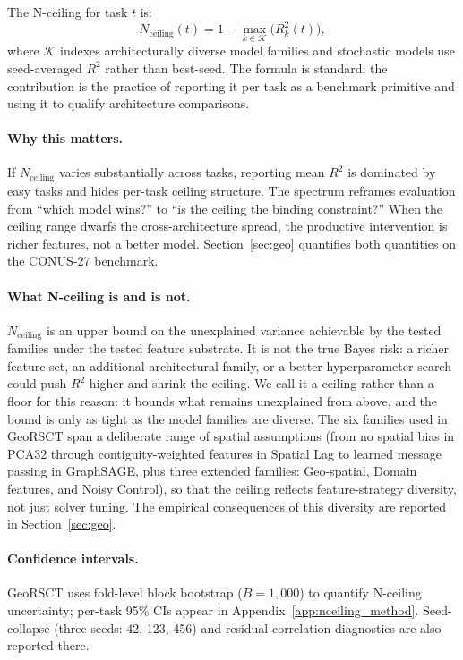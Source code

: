 \documentclass{article}
\begin{document}
The N-ceiling for task $t$ is:
\begin{equation}
N_{\text{ceiling}}(t) = 1 - \max_{k \in \mathcal{K}}\bigl(R^2_k(t)\bigr),
\label{eq:nceiling}
\end{equation}
where $\mathcal{K}$ indexes architecturally diverse model families and stochastic models use seed-averaged $R^2$ rather than best-seed. The formula is standard; the contribution is the practice of reporting it per task as a benchmark primitive and using it to qualify architecture comparisons.

\paragraph{Why this matters.} If $N_{\text{ceiling}}$ varies substantially across tasks, reporting mean $R^2$ is dominated by easy tasks and hides per-task ceiling structure. The spectrum reframes evaluation from ``which model wins?'' to ``is the ceiling the binding constraint?'' When the ceiling range dwarfs the cross-architecture spread, the productive intervention is richer features, not a better model. Section~\ref{sec:geo} quantifies both quantities on the CONUS-27 benchmark.

\paragraph{What N-ceiling is and is not.} $N_{\text{ceiling}}$ is an upper bound on the unexplained variance achievable by the tested families under the tested feature substrate. It is not the true Bayes risk: a richer feature set, an additional architectural family, or a better hyperparameter search could push $R^2$ higher and shrink the ceiling. We call it a ceiling rather than a floor for this reason: it bounds what remains unexplained from above, and the bound is only as tight as the model families are diverse. The six families used in GeoRSCT span a deliberate range of spatial assumptions (from no spatial bias in PCA32 through contiguity-weighted features in Spatial Lag to learned message passing in GraphSAGE, plus three extended families: Geo-spatial, Domain features, and Noisy Control), so that the ceiling reflects feature-strategy diversity, not just solver tuning. The empirical consequences of this diversity are reported in Section~\ref{sec:geo}.

\paragraph{Confidence intervals.} GeoRSCT uses fold-level block bootstrap ($B{=}1{,}000$) to quantify N-ceiling uncertainty; per-task 95\% CIs appear in Appendix~\ref{app:nceiling_method}. Seed-collapse (three seeds: 42, 123, 456) and residual-correlation diagnostics are also reported there.
\end{document}
